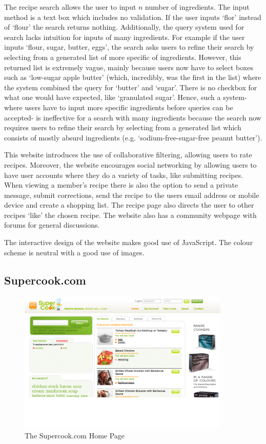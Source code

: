 The recipe search allows the user to input $n$ number of ingredients. The input method is a text box which includes no validation. If the user inputs ‘flor’ instead of ‘flour’ the search returns nothing. Additionally, the query system used for search lacks intuition for inputs of many ingredients. For example if the user inputs ‘flour, sugar, butter, eggs’, the search asks users to refine their search by selecting from a generated list of more specific of ingredients. However, this returned list is extremely vague, mainly because users now have to select boxes such as ‘low-sugar apple butter’ (which, incredibly, was the first in the list) where the system combined the query for ‘butter’ and ‘sugar’. There is no checkbox for what one would have expected, like ‘granulated sugar’. Hence, such a system- where users have to input more specific ingredients before queries can be accepted- is ineffective for a search with many ingredients because the search now requires users to refine their search by selecting from a generated list which consists of mostly absurd ingredients (e.g. ‘sodium-free-sugar-free peanut butter’).
 
This website introduces the use of collaborative filtering, allowing users to rate recipes. Moreover, the website encourages social networking by allowing users to have user accounts where they do a variety of tasks, like submitting recipes. When viewing a member’s recipe there is also the option to send a private message, submit corrections, send the recipe to the users email address or mobile device and create a shopping list. The recipe page also directs the user to other recipes ‘like’ the chosen recipe. The website also has a community webpage with forums for general discussions. 

The interactive design of the website makes good use of JavaScript. The colour scheme is neutral with a good use of images.

\subsection{Supercook.com}

\begin{figure}[h]
\includegraphics[width=0.9\textwidth]{screenshot_supercook}
\caption{The Supercook.com Home Page}
\label{fig:supercook}
\end{figure}


